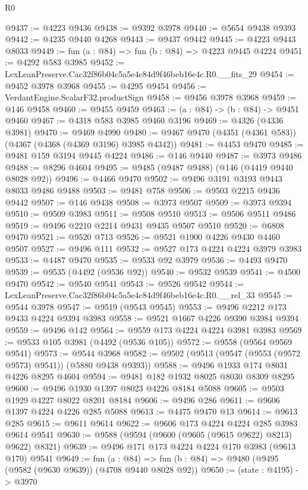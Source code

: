 \begin{lexlean}{R0}
\begin{coremodule}
@9437 := @4223 @9436
@9438 := @9392 @3978
@9440 := @5654 @9438 @9393
@9442 := @4235 @9440 @4268
@9443 := @9437 @9442
@9445 := @4223 @9443 @8033
@9449 := fun (a : @84) => fun (b : @84) => @4223 @9445 @4224
@9451 := @4292 @583 @3985
@9452 := LexLeanPreserve.Cac32f86b04c5a5e4c84d9f46beb16e4c.R0.__fits_29
@9454 := @9452 @3978 @3968
@9455 := @4295 @9454
@9456 := VerdantEngine.ScalarF32.productSign
@9458 := @9456 @3978 @3968
@9459 := @146 @9458
@9460 := @9455 @9459
@9463 := (a : @84) -> (b : @84) -> @9451 @9460
@9467 := @4318 @583 @3985 @9460 @3196
@9469 := @4326 (@4336 @3981)
@9470 := @9469 @4990
@9480 := @9467 @9470 (@4351 (@4361 @583)) (@4367 (@4368 (@4369 @3196) @3985 @4342))
@9481 := @4453 @9470
@9485 := @9481 @159 @3194 @9445 @4224
@9486 := @146 @9440
@9487 := @3973 @9486
@9488 := @8296 @4604
@9495 := @9485 (@9487 @9488) (@146 (@4419 @9440 @8028 @92))
@9496 := @4466 @9470
@9502 := @9496 @3191 @3193 @9443 @8033 @9486 @9488
@9503 := @9481 @758
@9506 := @9503 @2215 @9436 @9442
@9507 := @146 @9438
@9508 := @3973 @9507
@9509 := @3973 @9394
@9510 := @9509 @3983
@9511 := @9508 @9510
@9513 := @9506 @9511 @9486
@9519 := @9496 @2210 @2214 @9431 @9435 @9507 @9510
@9520 := @6808 @9470
@9521 := @9520 @713
@9526 := @9521 @1900 @4226 @9430 @4460 @9507
@9527 := @9496 @111
@9532 := @9527 @173 @4224 @4224 @3979 @3983
@9533 := @4487 @9470
@9535 := @9533 @92 @3979
@9536 := @4493 @9470
@9539 := @9535 (@4492 (@9536 @92))
@9540 := @9532 @9539
@9541 := @4500 @9470
@9542 := @9540 @9541
@9543 := @9526 @9542
@9544 := LexLeanPreserve.Cac32f86b04c5a5e4c84d9f46beb16e4c.R0.__rel_33
@9545 := @9544 @3978
@9547 := @9519 (@9543 @9545)
@9553 := @9496 @2212 @173 @9433 @4224 @9394 @3983
@9558 := @9521 @1667 @4226 @9390 @3984 @9394
@9559 := @9496 @142
@9564 := @9559 @173 @4224 @4224 @3981 @3983
@9569 := @9533 @105 @3981 (@4492 (@9536 @105))
@9572 := @9558 (@9564 @9569 @9541)
@9573 := @9544 @3968
@9582 := @9502 (@9513 (@9547 (@9553 (@9572 @9573) @9541)) (@5880 @9438 @9393))
@9588 := @9496 @1933 @174 @8031 @4226 @8295 @4604
@9594 := @9481 @182 @1932 @8025 @8030 @8309 @8295
@9600 := @9496 @1930 @1397 @8023 @4226 @8184 @5088
@9605 := @9503 @1929 @4227 @8022 @8201 @8184
@9606 := @9496 @286
@9611 := @9606 @1397 @4224 @4226 @285 @5088
@9613 := @4475 @9470 @13
@9614 := @9613 @285
@9615 := @9611 @9614
@9622 := @9606 @173 @4224 @4224 @285 @3983 @9614 @9541
@9630 := @9588 (@9594 (@9600 (@9605 (@9615 @9622) @8213) @9622) @8321)
@9639 := @9496 @171 @173 @4224 @4224 @170 @3983 (@9613 @170) @9541
@9649 := fun (a : @84) =>
  fun (b : @84) => @9480 (@9495 (@9582 (@9630 @9639)) (@4708 @9440 @8028 @92))
@9650 := (state : @4195) -> @3970

\end{coremodule}
\end{lexlean}
